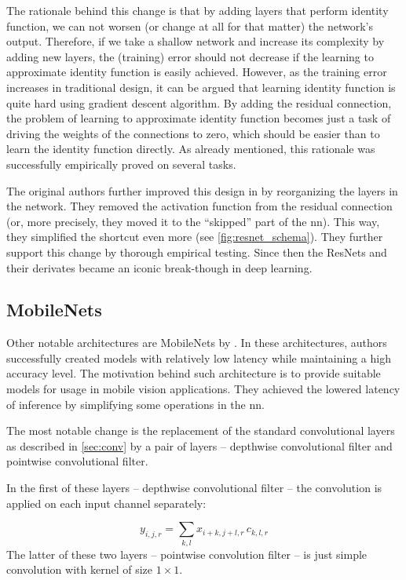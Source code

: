 The rationale behind this change is that by adding layers that perform identity function, we can not worsen (or change at all for that matter) the network's output. Therefore, if we take a shallow network and increase its complexity by adding new layers, the (training) error should not decrease if the learning to approximate identity function is easily achieved. However, as the training error increases in traditional design, it can be argued that learning identity function is quite hard using gradient descent algorithm. By adding the residual connection, the problem of learning to approximate identity function becomes just a task of driving the weights of the connections to zero, which should be easier than to learn the identity function directly. As already mentioned, this rationale was successfully empirically proved on several tasks.

The original authors further improved this design in \cite{resnetimp} by reorganizing the layers in the network. They removed the activation function from the residual connection (or, more precisely, they moved it to the ``skipped'' part of the \gls{nn}). This way, they simplified the shortcut even more (see \autoref{fig:resnet_schema}). They further support this change by thorough empirical testing. Since then the ResNets and their derivates became an iconic break-though in deep learning.

\subsection{MobileNets}

\label{ssec:mobilenet}

Other notable architectures are MobileNets by \cite{mobilenets}. In these architectures, authors successfully created models with relatively low latency while maintaining a high accuracy level. The motivation behind such architecture is to provide suitable models for usage in mobile vision applications. They achieved the lowered latency of inference by simplifying some operations in the \gls{nn}.

The most notable change is the replacement of the standard convolutional layers as described in \autoref{sec:conv} by a pair of layers -- depthwise convolutional filter and pointwise convolutional filter.

In the first of these layers -- depthwise convolutional filter -- the convolution is applied on each input channel separately:

$$y_{i, j, r} = \sum_{k, l} x_{i+k, j+l, r} \, c_{k, l, r}$$
The latter of these two layers -- pointwise convolution filter -- is just simple convolution with kernel of size $1 \times 1$.

